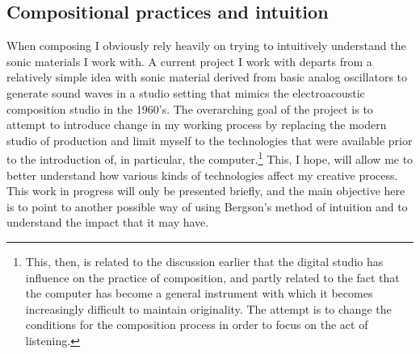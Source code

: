\documentclass[11pt]{article}
\begin{document}
\subsection*{Compositional practices and intuition}
\label{sec:orgcae3bd4}
When composing I obviously rely heavily on trying to intuitively understand the sonic materials I work with.
A current project I work with departs from a relatively simple idea with sonic material derived from basic analog oscillators to generate sound waves in a studio setting that mimics the electroacoustic composition studio in the 1960's.
The overarching goal of the project is to attempt to introduce change in my working process by replacing the modern studio of production and limit myself to the technologies that were available prior to the introduction of, in particular, the computer.\footnote{This, then, is related to the discussion earlier that the digital studio has influence on the practice of composition, and partly related to the fact that the computer has become a general instrument with which it becomes increasingly difficult to maintain originality. The attempt is to change the conditions for the composition process in order to focus on the act of listening.}
This, I hope, will allow me to better understand how various kinds of technologies affect my creative process.
This work in progress will only be presented briefly, and the main objective here is to point to another possible way of using Bergson's method of intuition and to understand the impact that it may have.
\end{document}
